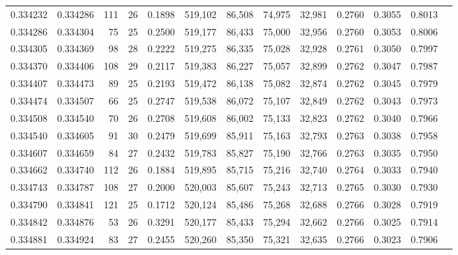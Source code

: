 \begin{tabular}{rrrrrrrrrrrrr}
0.334232 & 0.334286 &   111 &  26 &                                     0.1898 & 519,102 &  86,508 &  74,975 &  32,981 & 0.2760 & 0.3055 & 0.8013 \\
0.334286 & 0.334304 &    75 &  25 &                                     0.2500 & 519,177 &  86,433 &  75,000 &  32,956 & 0.2760 & 0.3053 & 0.8006 \\
0.334305 & 0.334369 &    98 &  28 &                                     0.2222 & 519,275 &  86,335 &  75,028 &  32,928 & 0.2761 & 0.3050 & 0.7997 \\
0.334370 & 0.334406 &   108 &  29 &                                     0.2117 & 519,383 &  86,227 &  75,057 &  32,899 & 0.2762 & 0.3047 & 0.7987 \\
0.334407 & 0.334473 &    89 &  25 &                                     0.2193 & 519,472 &  86,138 &  75,082 &  32,874 & 0.2762 & 0.3045 & 0.7979 \\
0.334474 & 0.334507 &    66 &  25 &                                     0.2747 & 519,538 &  86,072 &  75,107 &  32,849 & 0.2762 & 0.3043 & 0.7973 \\
0.334508 & 0.334540 &    70 &  26 &                                     0.2708 & 519,608 &  86,002 &  75,133 &  32,823 & 0.2762 & 0.3040 & 0.7966 \\
0.334540 & 0.334605 &    91 &  30 &                                     0.2479 & 519,699 &  85,911 &  75,163 &  32,793 & 0.2763 & 0.3038 & 0.7958 \\
0.334607 & 0.334659 &    84 &  27 &                                     0.2432 & 519,783 &  85,827 &  75,190 &  32,766 & 0.2763 & 0.3035 & 0.7950 \\
0.334662 & 0.334740 &   112 &  26 &                                     0.1884 & 519,895 &  85,715 &  75,216 &  32,740 & 0.2764 & 0.3033 & 0.7940 \\
0.334743 & 0.334787 &   108 &  27 &                                     0.2000 & 520,003 &  85,607 &  75,243 &  32,713 & 0.2765 & 0.3030 & 0.7930 \\
0.334790 & 0.334841 &   121 &  25 &                                     0.1712 & 520,124 &  85,486 &  75,268 &  32,688 & 0.2766 & 0.3028 & 0.7919 \\
0.334842 & 0.334876 &    53 &  26 &                                     0.3291 & 520,177 &  85,433 &  75,294 &  32,662 & 0.2766 & 0.3025 & 0.7914 \\
0.334881 & 0.334924 &    83 &  27 &                                     0.2455 & 520,260 &  85,350 &  75,321 &  32,635 & 0.2766 & 0.3023 & 0.7906 \\

\end{tabular}

